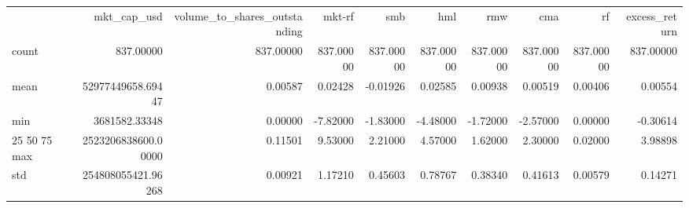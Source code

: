 \begin{tabular}{lrrrrrrrrr}
 & mkt_cap_usd & volume_to_shares_outstanding & mkt-rf & smb & hml & rmw & cma & rf & excess_return \\
count & 837.00000 & 837.00000 & 837.00000 & 837.00000 & 837.00000 & 837.00000 & 837.00000 & 837.00000 & 837.00000 \\
mean & 52977449658.69447 & 0.00587 & 0.02428 & -0.01926 & 0.02585 & 0.00938 & 0.00519 & 0.00406 & 0.00554 \\
min & 3681582.33348 & 0.00000 & -7.82000 & -1.83000 & -4.48000 & -1.72000 & -2.57000 & 0.00000 & -0.30614 \\
25%
50%
75%
max & 2523206838600.00000 & 0.11501 & 9.53000 & 2.21000 & 4.57000 & 1.62000 & 2.30000 & 0.02000 & 3.98898 \\
std & 254808055421.96268 & 0.00921 & 1.17210 & 0.45603 & 0.78767 & 0.38340 & 0.41613 & 0.00579 & 0.14271 \\
\end{tabular}
